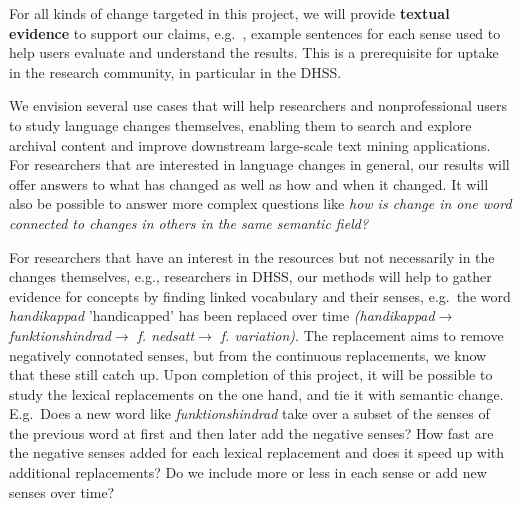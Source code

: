 \documentclass[12pt,twoside,a4paper]{article}
\newcommand\eg{{e.g.\ }}
\newcommand\Eg{{E.g.\ }}
\begin{document}
 \vspace{-0.5cm}   
         For all kinds of change targeted in this project, we will provide 	\textbf{textual evidence} to support our claims, \eg, example sentences for each sense used to help users evaluate and understand the results. This is a prerequisite for uptake in the research community, in particular in the DHSS. %
	
	We envision several use cases that will help researchers and nonprofessional users to study language changes themselves, enabling them to search and explore archival content and improve downstream large-scale text mining applications.  For researchers that are interested in language changes in general, our results will offer answers to what has changed as well as how and when it changed. It will also be possible to answer more complex questions like \textit{how is change in one word connected to changes in others in the same semantic field?}
    
For researchers that have an interest in the resources but not necessarily in the changes themselves, e.g., researchers in DHSS, our methods will help to gather evidence for concepts by finding linked vocabulary and their senses, \eg the word \textit{handikappad} 'handicapped' has been replaced over time \textit{(handikappad$\rightarrow$ funktionshindrad$\rightarrow$ f. nedsatt$\rightarrow$ f. variation)}. The replacement aims to remove negatively connotated senses, but from the continuous replacements, we know that these still catch up. 
%
Upon completion of this project, it will be possible to study the lexical replacements on the one hand, and tie it with semantic change. \Eg Does a new word like \textit{funktionshindrad} take over a subset of the senses of the previous word at first and then later add the negative senses? How fast are the negative senses added for each lexical replacement and does it speed up with additional replacements? Do we include more or less in each sense or add new senses over time?  
   
	 

	
	
\end{document}
